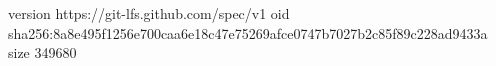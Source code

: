 version https://git-lfs.github.com/spec/v1
oid sha256:8a8e495f1256e700caa6e18c47e75269afce0747b7027b2c85f89c228ad9433a
size 349680

